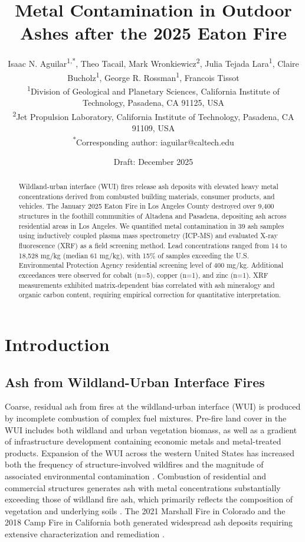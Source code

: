 \documentclass[12pt,letterpaper]{article}
\title{Metal Contamination in Outdoor Ashes after the 2025 Eaton Fire}
\author{
Isaac N. Aguilar\textsuperscript{1,*}, Theo Tacail, Mark Wronkiewicz\textsuperscript{2}, Julia Tejada Lara\textsuperscript{1}, Claire Bucholz\textsuperscript{1}, George R. Rossman\textsuperscript{1}, Francois Tissot \\
\textsuperscript{1}Division of Geological and Planetary Sciences, California Institute of Technology, Pasadena, CA 91125, USA \\
\textsuperscript{2}Jet Propulsion Laboratory, California Institute of Technology, Pasadena, CA 91109, USA \\
\textsuperscript{*}Corresponding author: iaguilar@caltech.edu
}
\date{Draft: December 2025}
\begin{document}
\maketitle

\begin{abstract}

Wildland-urban interface (WUI) fires release ash deposits with elevated heavy metal concentrations derived from combusted building materials, consumer products, and vehicles. The January 2025 Eaton Fire in Los Angeles County destroyed over 9,400 structures in the foothill communities of Altadena and Pasadena, depositing ash across residential areas in Los Angeles. We quantified metal contamination in 39 ash samples using inductively coupled plasma mass spectrometry (ICP-MS) and evaluated X-ray fluorescence (XRF) as a field screening method. Lead concentrations ranged from 14 to 18,528 mg/kg (median 61 mg/kg), with 15\% of samples exceeding the U.S. Environmental Protection Agency residential screening level of 400 mg/kg. Additional exceedances were observed for cobalt (n=5), copper (n=1), and zinc (n=1). XRF measurements exhibited matrix-dependent bias correlated with ash mineralogy and organic carbon content, requiring empirical correction for quantitative interpretation. 

\end{abstract}


\section{Introduction}

\subsection{Ash from Wildland-Urban Interface Fires}
Coarse, residual ash from fires at the wildland-urban interface (WUI) is produced by incomplete combustion of complex fuel mixtures. Pre-fire land cover in the WUI includes both wildland and urban vegetation biomass, as well as a gradient of infrastructure development containing economic metals and metal-treated products. Expansion of the WUI across the western United States has increased both the frequency of structure-involved wildfires and the magnitude of associated environmental contamination \citep{Radeloff2018}. Combustion of residential and commercial structures generates ash with metal concentrations substantially exceeding those of wildland fire ash, which primarily reflects the composition of vegetation and underlying soils \citep{Plumlee2007, Quarles2020}. The 2021 Marshall Fire in Colorado and the 2018 Camp Fire in California both generated widespread ash deposits requiring extensive characterization and remediation \citep{Gabos2023, Hubbs2023}. 
\end{document}
